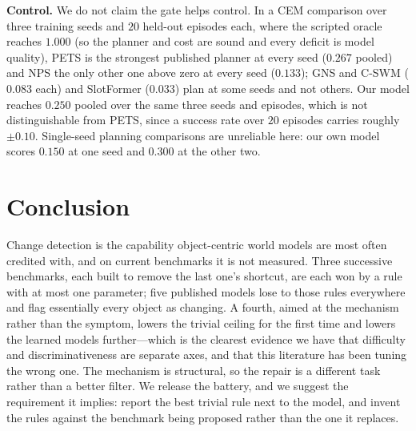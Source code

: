 \documentclass{article}
\begin{document}
\textbf{Control.} We do not claim the gate helps control. In a CEM
\citep{rubinstein2004cem} comparison over three training seeds and $20$ held-out episodes each,
where the scripted oracle reaches $1.000$ (so the planner and cost are sound and every deficit
is model quality), PETS is the strongest published planner at every seed ($0.267$ pooled) and
NPS the only other one above zero at every seed ($0.133$); GNS and C-SWM ($0.083$ each) and
SlotFormer ($0.033$) plan at some seeds and not others. Our model reaches $0.250$ pooled over the
same three seeds and episodes, which is not distinguishable from PETS, since a success rate over
$20$ episodes carries roughly $\pm 0.10$. Single-seed planning comparisons are unreliable here:
our own model scores $0.150$ at one seed and $0.300$ at the other two.

\section{Conclusion}

Change detection is the capability object-centric world models are most often credited with,
and on current benchmarks it is not measured. Three successive benchmarks, each built to remove
the last one's shortcut, are each won by a rule with at most one parameter; five published
models lose to those rules everywhere and flag essentially every object as changing. A fourth,
aimed at the mechanism rather than the symptom, lowers the trivial ceiling for the first time
and lowers the learned models further---which is the clearest evidence we have that difficulty
and discriminativeness are separate axes, and that this literature has been tuning the wrong
one. The mechanism is structural, so the repair is a different task rather than a better
filter. We release the battery, and we suggest the requirement it implies: report the best
trivial rule next to the model, and invent the rules against the benchmark being proposed
rather than the one it replaces.

\end{document}

